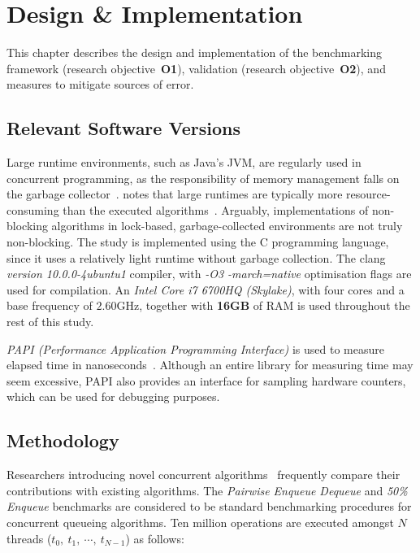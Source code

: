 \chapter{Design \& Implementation}
This chapter describes the design and 
implementation of the benchmarking framework  (research objective~\textbf{O1}),
validation (research objective~\textbf{O2}), and measures
to mitigate sources of error.

\section{Relevant Software Versions}
Large runtime environments, such as Java's JVM, are regularly used in
concurrent programming, as the responsibility of memory management falls on the
garbage collector~\citep{kogan2011wait}. \citeauthor{fog2020optimizing} notes
that large runtimes are typically more resource-consuming than the executed
algorithms~\citep{fog2020optimizing}. Arguably, implementations of non-blocking
algorithms in lock-based, garbage-collected environments are not truly
non-blocking. The study is implemented using the C programming language, since
it uses a relatively light runtime without garbage collection. The clang
\emph{version 10.0.0-4ubuntu1} compiler, with \emph{-O3 -march=native}
optimisation flags are used for compilation. An \emph{Intel Core i7 6700HQ
(Skylake)}, with four cores and a base frequency of $2.60\text{GHz}$, together
with \textbf{16GB} of RAM is used throughout the rest of this study.

\emph{PAPI (Performance Application Programming Interface)} is used to measure
elapsed time in nanoseconds~\citep{terpstra2010papi}. Although an entire library for measuring time 
may seem excessive, PAPI also provides an interface for
sampling hardware counters, which can be used for debugging purposes.


\section{Methodology}

Researchers introducing novel concurrent
algorithms~\citep{michael1996simple,valois1994queues,kogan2011wait,hoffman2007baskets,yang2016wait}
frequently compare their contributions with existing algorithms. The
\emph{Pairwise Enqueue Dequeue} and \emph{50\% Enqueue}
benchmarks are considered to be standard benchmarking procedures for concurrent
queueing algorithms. Ten million operations are
executed amongst $N$ threads ($t_0,~t_1,~\cdots,~t_{N-1}$) as follows: 

